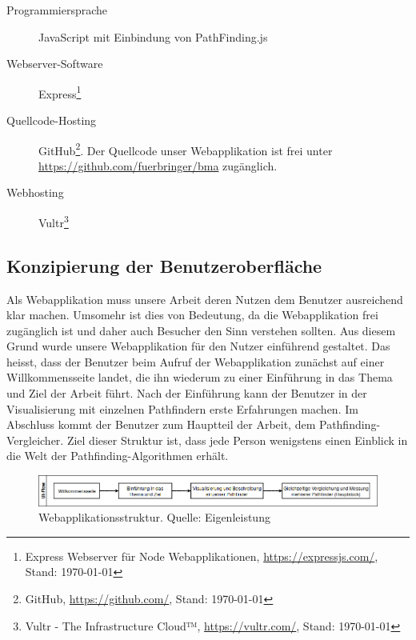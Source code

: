 \documentclass[12pt,a4paper,german]{report}
\begin{document}
\begin{description}
  \item [Programmiersprache] JavaScript mit Einbindung von PathFinding.js \cite{pfjs}
  \item [Webserver-Software] Express\footnote{Express Webserver für Node Webapplikationen, \url{https://expressjs.com/}, Stand: \today}
  \item [Quellcode-Hosting] GitHub\footnote{GitHub, \url{https://github.com/}, Stand: \today}. Der Quellcode unser Webapplikation ist frei unter\\ \url{https://github.com/fuerbringer/bma} zugänglich.
  \item [Webhosting] Vultr\footnote{Vultr - The Infrastructure Cloud™, \url{https://vultr.com/}, Stand: \today}
\end{description}

\subsection{Konzipierung der Benutzeroberfläche}
Als Webapplikation muss unsere Arbeit deren Nutzen dem Benutzer ausreichend klar machen. 
Umsomehr ist dies von Bedeutung, da die Webapplikation frei zugänglich ist und daher auch Besucher den Sinn verstehen sollten. 
Aus diesem Grund wurde unsere Webapplikation für den Nutzer einführend gestaltet. 
Das heisst, dass der Benutzer beim Aufruf der Webapplikation zunächst auf einer Willkommensseite landet, die ihn wiederum zu einer Einführung in das Thema und Ziel der Arbeit führt. 
Nach der Einführung kann der Benutzer in der Visualisierung mit einzelnen Pathfindern erste Erfahrungen machen. 
Im Abschluss kommt der Benutzer zum Hauptteil der Arbeit, dem Pathfinding-Vergleicher. 
Ziel dieser Struktur ist, dass jede Person wenigstens einen Einblick in die Welt der Pathfinding-Algorithmen erhält.
\begin{figure}[H]
  \centering
  \includegraphics[width=16cm]{uiflow}
  \caption[Struktur der Webapplikation.]{Webapplikationsstruktur. Quelle: Eigenleistung}
  \label{fig:uiflow}
\end{figure}

\clearpage
\end{document}

